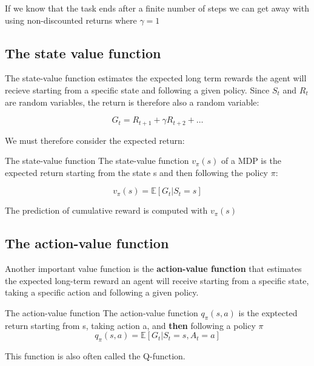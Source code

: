 If we know that the task ends after a finite number of steps we can get away with using non-discounted returns where $\gamma = 1$

\subsection{The state value function}
The state-value function estimates the expected long term rewards the agent will recieve starting from a specific state and following a given policy. Since $S_t$ and $R_t$ are random variables, the return is therefore also a random variable:

	\begin{equation}
		G_t = R_{t+1} + \gamma R_{t+2} + \ldots
	\nonumber
	\end{equation}

We must therefore consider the expected return:

	\begin{wbox}{The state-value function}
	The state-value function $v_\pi (s)$ of a MDP is the expected return starting from the state s and then following the policy $\pi$:

		\begin{equation}
			v_\pi (s) = \mathbb{E}[G_t | S_t = s]
		\end{equation}
	\end{wbox}

The prediction of cumulative reward is computed with $v_\pi(s)$



\subsection{The action-value function}
Another important value function is the \textbf{action-value function} that estimates the expected long-term reward an agent will receive starting from a specific state, taking a specific action and following a given policy.

	\begin{wbox}{The action-value function}
	The action-value function $q_\pi(s,a)$ is the exptected return starting from s, taking action a, and \textbf{then} following a policy $\pi$
		\begin{equation}
			q_\pi (s,a) = \mathbb{E}[G_t | S_t = s, A_t = a]
		\end{equation}
	\end{wbox}

This function is also often called the Q-function. 

